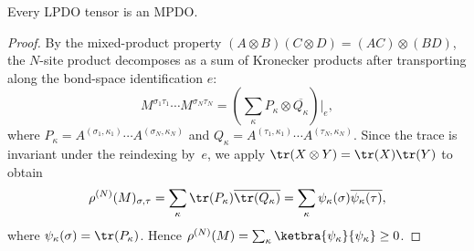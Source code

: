 \begin{theorem}\label{thm:lpdo_is_mpdo}
    \leanok
    Every LPDO tensor is an MPDO.
\end{theorem}

\begin{proof}
    \leanok
    By the mixed-product property
    $(A \otimes B)(C \otimes D) = (AC) \otimes (BD)$, the $N$-site product
    decomposes as a sum of Kronecker products after transporting along the
    bond-space identification $e$:
    \[
        M^{\sigma_1 \tau_1} \cdots M^{\sigma_N \tau_N}
        = (\sum_{\kappa} P_\kappa \otimes \overline{Q_\kappa})
        \big|_{e},
    \]
    where $P_\kappa = A^{(\sigma_1,\kappa_1)} \cdots A^{(\sigma_N,\kappa_N)}$
    and $Q_\kappa = A^{(\tau_1,\kappa_1)} \cdots A^{(\tau_N,\kappa_N)}$.
    Since the trace is invariant under the reindexing by~$e$,
    we apply $\tr(X \otimes Y) = \tr(X)\tr(Y)$ to obtain
    \[
        \rho^{(N)}(M)_{\sigma,\tau}
        = \sum_\kappa \tr(P_\kappa) \overline{\tr(Q_\kappa)}
        = \sum_\kappa \psi_\kappa(\sigma) \overline{\psi_\kappa(\tau)},
    \]
    where $\psi_\kappa(\sigma) = \tr(P_\kappa)$.
    Hence $\rho^{(N)}(M) = \sum_\kappa \ketbra{\psi_\kappa}{\psi_\kappa} \ge 0$.
\end{proof}
